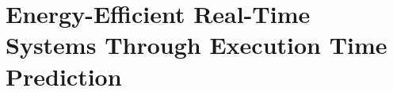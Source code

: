 \chapter{Energy-Efficient Real-Time Systems Through Execution Time Prediction}
\label{chap:exec_time_prediction}
